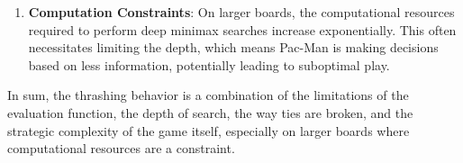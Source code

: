 \begin{answer}
\begin{enumerate}[label=\textbf{\arabic*.}]
\item \textbf{Computation Constraints}: On larger boards, the computational resources required to perform deep minimax searches increase exponentially. This often necessitates limiting the depth, which means Pac-Man is making decisions based on less information, potentially leading to suboptimal play.
\end{enumerate}

In sum, the thrashing behavior is a combination of the limitations of the evaluation function, the depth of search, the way ties are broken, and the strategic complexity of the game itself, especially on larger boards where computational resources are a constraint.

\end{answer}
\clearpage


